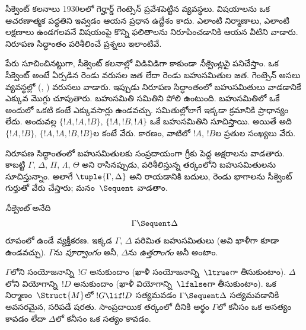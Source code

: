 \documentclass[../../../include/open-logic-section]{subfiles}
\begin{document}


సీక్వెంట్ కలనాలు 1930లలో గెర్హార్డ్ గెంట్సెన్ ప్రవేశపెట్టిన  వ్యవస్థలు. విషయాలను  ఒక ఆచరణాత్మక పద్ధతిని ఇవ్వడం ఆయన ప్రధాన ఉద్దేశం కాదు.  ఎలాంటి నిర్మాణాలు, ఎలాంటి లక్షణాలు ఉండగలవనే విషయంపై కొన్ని ఫలితాలను నిరూపించడానికి ఆయన వీటిని వాడారు. నిరూపణ సిద్ధాంతం పరిశీలించే ప్రశ్నలు ఇలాంటివే.

పేరు సూచించినట్టుగా, సీక్వెంట్ కలనాల్లో విడివిడిగా  కాకుండా \emph{సీక్వెంట్లపై} పనిచేస్తాం. ఒక సీక్వెంట్ అంటే  ఏర్పడిన రెండు వరుసల జత లేదా రెండు బహుసమితుల జత. గెంట్సెన్ అసలు వ్యవస్థల్లో (, ) వరుసలు వాడారు. ఇప్పుడు నిరూపణ సిద్ధాంతంలో బహుసమితులు వాడడానికే ఎక్కువ మొగ్గు చూపుతారు. బహుసమితి సమితిని పోలి ఉంటుంది. బహుసమితిలో ఒకే  అందులో ఒకటి కంటే ఎక్కువసార్లు ఉండవచ్చు. సమితుల్లోలాగే ఇక్కడా  క్రమానికి ప్రాధాన్యం లేదు. అందువల్ల $\{!A, !A, !B\}$, $\{!A, !B, !A\}$ ఒకే బహుసమితిని సూచిస్తాయి. అయితే అది $\{!A,
!B\}$, $\{!A, !A, !B, !B\}$ల కంటే వేరు. కారణం, వాటిలో $!A$, $!B$ల ప్రతుల సంఖ్యలు వేరు.

నిరూపణ సిద్ధాంతంలో  బహుసమితులకు సంప్రదాయంగా గ్రీకు పెద్ద అక్షరాలను వాడతారు. కాబట్టి $\Gamma$, $\Delta$, $\Pi$, $\Lambda$, $\Theta$ అని రాసినప్పుడు, పరిశీలిస్తున్న తర్కంలోని  బహుసమితులను సూచిస్తున్నాం. అలాగే $\tuple{\Gamma, \Delta}$ అని రాయడానికి బదులు, రెండు భాగాలను సీక్వెంట్ గుర్తుతో వేరు చేస్తారు; మనం~$\Sequent$ వాడతాం.

\begin{defn}[సీక్వెంట్]
\emph{సీక్వెంట్} అనేది
\[
\Gamma \Sequent \Delta
\]
రూపంలో ఉండే వ్యక్తీకరణ. ఇక్కడ $\Gamma$, $\Delta$  పరిమిత బహుసమితులు (అవి ఖాళీగా కూడా ఉండవచ్చు). $\Gamma$ను \emph{పూర్వాంగం} అనీ, $\Delta$ను \emph{ఉత్తరాంగం} అనీ అంటాం.
\end{defn}

$\Gamma$లోని  సంయోజనాన్ని~$!G$ అనుకుందాం (ఖాళీ సంయోజనాన్ని~$\ltrue$గా తీసుకుంటాం). $\Delta$లోని  వియోగాన్ని~$!D$ అనుకుందాం (ఖాళీ వియోగాన్ని~$\lfalse$గా తీసుకుంటాం). ఒక నిర్మాణం~$\Struct{M}$లో $!G \lif !D$ సత్యమవడం $\Gamma \Sequent \Delta$ సత్యమవడానికి అవసరమైన, సరిపడే షరతు. సాంప్రదాయిక తర్కంలో దీనికి అర్థం $\Gamma$లో కనీసం ఒక  అసత్యం కావడం లేదా $\Delta$లో కనీసం ఒక  సత్యం కావడం.
\end{document}
